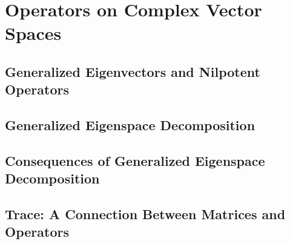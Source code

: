 \chapter{Operators on Complex Vector Spaces}

\section{Generalized Eigenvectors and Nilpotent Operators}

\section{Generalized Eigenspace Decomposition}

\section{Consequences of Generalized Eigenspace Decomposition}

\section{Trace: A Connection Between Matrices and Operators}

